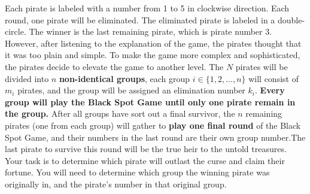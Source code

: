 \documentclass[12pt,a4paper]{article}
\begin{document}
\begin{center}
\end{center}

\noindent
Each pirate is labeled with a number from 1 to 5 in clockwise direction. Each round, one pirate will be eliminated. 
The eliminated pirate is labeled in a double-circle. The winner is the last remaining pirate, which is pirate number 3.\\

\noindent
However, after listening to the explanation of the game, the pirates thought that it was too plain and simple.
To make the game more complex and sophisticated, the pirates decide to elevate the game to another level. The \(N\) pirates will be divided into \(n\) \textbf{non-identical groups}, 
each group \(i \in \{1, 2, ..., n\}\) will consist of \(m_i\) pirates, and the group will be assigned an elimination number \(k_i\).
\textbf{Every group will play the Black Spot Game until only one pirate remain in the group.} After all groups have sort out a final survivor,
the \(n\) remaining pirates (one from each group) will gather to \textbf{play one final round} of the Black Spot Game, and their numbers in the last round are their own group number.The last pirate to survive this round will be the true heir to the untold treasures.\\

\noindent
Your task is to determine which pirate will outlast the curse and claim their fortune.
You will need to determine which group the winning pirate was originally in, and the pirate's number in that original group. 
\end{document}
